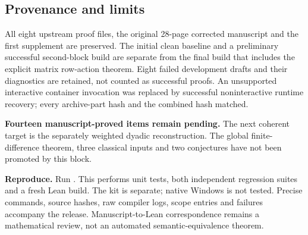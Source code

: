 \subsection*{Provenance and limits}
All eight upstream proof files, the original 28-page corrected manuscript and the first supplement are preserved. The initial clean baseline and a preliminary successful second-block build are separate from the final build that includes the explicit matrix row-action theorem. Eight failed development drafts and their diagnostics are retained, not counted as successful proofs. An unsupported interactive container invocation was replaced by successful noninteractive runtime recovery; every archive-part hash and the combined hash matched.

\textbf{Fourteen manuscript-proved items remain pending.} The next coherent target is the separately weighted dyadic reconstruction. The global finite-difference theorem, three classical inputs and two conjectures have not been promoted by this block.

\textbf{Reproduce.} Run . This performs unit tests, both independent regression suites and a fresh Lean build. The kit is separate; native Windows is not tested. Precise commands, source hashes, raw compiler logs, scope entries and failures accompany the release. Manuscript-to-Lean correspondence remains a mathematical review, not an automated semantic-equivalence theorem.
